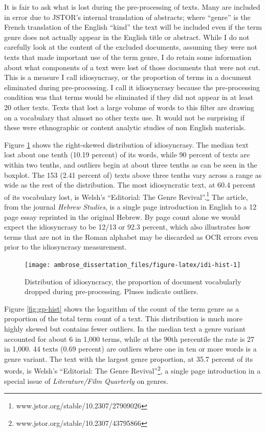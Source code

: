 \documentclass[]{book}
\let\rmarkdownfootnote\footnote%
\def\footnote{\protect\rmarkdownfootnote}
\theoremstyle{definition}
\theoremstyle{definition}
\theoremstyle{definition}
\theoremstyle{remark}
\begin{document}
It is fair to ask what is lost during the pre-processing of texts. Many
are included in error due to JSTOR's internal translation of abstracts;
where ``genre'' is the French translation of the English ``kind'' the
text will be included even if the term genre does not actually appear in
the English title or abstract. While I do not carefully look at the
content of the excluded documents, assuming they were not texts that
made important use of the term genre, I do retain some information about
what components of a text were lost of those documents that were not
cut. This is a measure I call idiosyncrasy, or the proportion of terms
in a document eliminated during pre-processing. I call it idiosyncrasy
because the pre-processing condition was that terms would be eliminated
if they did not appear in at least 20 other texts. Texts that lost a
large volume of words to this filter are drawing on a vocabulary that
almost no other texts use. It would not be surprising if these were
ethnographic or content analytic studies of non English materials.

Figure \ref{fig:idi-hist} shows the right-skewed distribution of
idiosyncrasy. The median text lost about one tenth (10.19 percent) of
its words, while 90 percent of texts are within two tenths, and outliers
begin at about three tenths as can be seen in the boxplot. The 153 (2.41
percent of) texts above three tenths vary across a range as wide as the
rest of the distribution. The most idiosyncratic text, at 60.4 percent
of its vocabulary lost, is Welsh's ``Editorial: The Genre
Revival''.\footnote{www.jstor.org/stable/10.2307/27909026} The article,
from the journal \emph{Hebrew Studies}, is a single page introduction in
English to a 12 page essay reprinted in the original Hebrew. By page
count alone we would expect the idiosyncrasy to be 12/13 or 92.3
percent, which also illustrates how terms that are not in the Roman
alphabet may be discarded as OCR errors even prior to the idiosyncrasy
measurement.

\begin{figure}

{\centering \texttt{[image: ambrose\_dissertation\_files/figure-latex/idi-hist-1]} 

}

\caption{Distribution of idiosyncracy, the proportion of document vocabularly dropped during pre-processing. Pluses indicate outliers.}\label{fig:idi-hist}
\end{figure}

Figure \ref{fig:gp-hist} shows the logarithm of the count of the term
genre as a proportion of the total term count of a text. This
distribution is much more highly skewed but contains fewer outliers. In
the median text a genre variant accounted for about 6 in 1,000 terms,
while at the 90th percentile the rate is 27 in 1,000. 44 texts (0.69
percent) are outliers where one in ten or more words is a genre variant.
The text with the largest genre proportion, at 35.7 percent of its
words, is Welsh's ``Editorial: The Genre Revival''\footnote{www.jstor.org/stable/10.2307/43795866},
a single page introduction in a special issue of \emph{Literature/Film
Quarterly} on genres.
\end{document}
